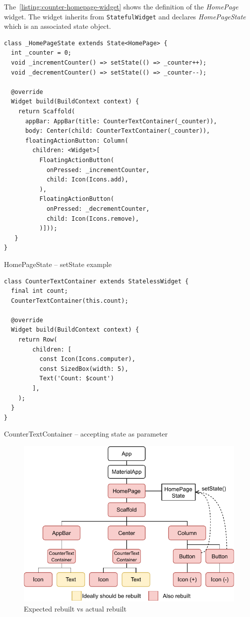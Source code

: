 The~\cref{listing:counter-homepage-widget} shows the definition of the \textit{HomePage} widget. The widget inherits from \verb|StatefulWidget| and declares \textit{HomePageState} which is an associated state object.

\begin{listing}[ht]
\begin{verbatim}
class _HomePageState extends State<HomePage> {
  int _counter = 0;
  void _incrementCounter() => setState(() => _counter++);
  void _decrementCounter() => setState(() => _counter--);

  @override
  Widget build(BuildContext context) {
    return Scaffold(
      appBar: AppBar(title: CounterTextContainer(_counter)),
      body: Center(child: CounterTextContainer(_counter)),
      floatingActionButton: Column(
        children: <Widget>[
          FloatingActionButton(
            onPressed: _incrementCounter,
            child: Icon(Icons.add),
          ),
          FloatingActionButton(
            onPressed: _decrementCounter,
            child: Icon(Icons.remove),
          )]));
   }
}
\end{verbatim}
\caption{HomePageState -- setState example}
\label{listing:counter-base-state-homepage}
\end{listing}

\begin{listing}[ht]
\begin{verbatim}
class CounterTextContainer extends StatelessWidget {
  final int count;
  CounterTextContainer(this.count);
  
  @override
  Widget build(BuildContext context) {
    return Row(
        children: [
          const Icon(Icons.computer),
          const SizedBox(width: 5),
          Text('Count: $count')
        ],
    );
  }
}
\end{verbatim}
\caption{CounterTextContainer -- accepting state as parameter}
\label{listing:counter-base-text-container}
\end{listing}

\begin{figure}[htp]
    \centering
    \includegraphics[width=0.75\linewidth]{img/flutter/counter-base-setState.pdf}
    \caption{Expected rebuilt vs actual rebuilt}
    \label{fig:counter-app-base-build}
\end{figure}

